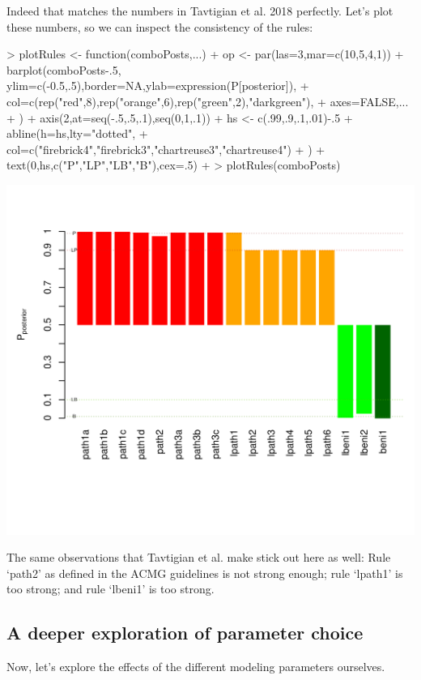 \documentclass[12pt]{article}
\begin{document}
Indeed that matches the numbers in Tavtigian et al. 2018 perfectly. Let's plot these numbers, so we can inspect the consistency of the rules:

\begin{Schunk}
\begin{Sinput}
> plotRules <- function(comboPosts,...) {
+   op <- par(las=3,mar=c(10,5,4,1))
+   barplot(comboPosts-.5, ylim=c(-0.5,.5),border=NA,ylab=expression(P[posterior]),
+   	col=c(rep("red",8),rep("orange",6),rep("green",2),"darkgreen"),
+   	axes=FALSE,...
+   )
+   axis(2,at=seq(-.5,.5,.1),seq(0,1,.1))
+   hs <- c(.99,.9,.1,.01)-.5
+   abline(h=hs,lty="dotted",
+     col=c("firebrick4","firebrick3","chartreuse3","chartreuse4")
+   )
+   text(0,hs,c("P","LP","LB","B"),cex=.5)
+ }
> plotRules(comboPosts)
\end{Sinput}
\end{Schunk}
\includegraphics{tavtigian-002}

The same observations that Tavtigian et al. make stick out here as well:
Rule `path2' as defined in the ACMG guidelines is not strong enough; rule `lpath1' is
too strong; and rule `lbeni1' is too strong.

\subsection*{A deeper exploration of parameter choice}

Now, let's explore the effects of the different modeling parameters ourselves.
\end{document}
